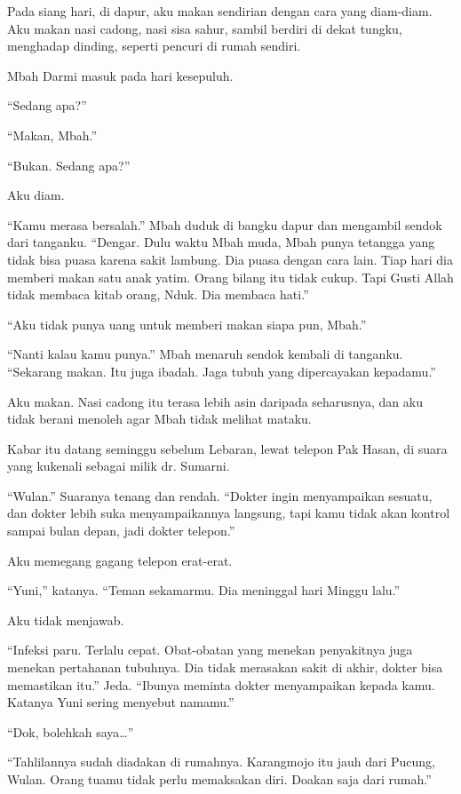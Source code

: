 \documentclass[11pt,twoside,openany]{book}
\makeatletter
\newcommand{\scenebreak}{\par\vspace{0.9em}{\centering\textsc{*\hspace{0.7em}*\hspace{0.7em}*}\par}\vspace{0.9em}\@afterindentfalse\@afterheading}
\makeatother
\begin{document}
Pada siang hari, di dapur, aku makan sendirian dengan cara yang diam-diam. Aku makan nasi cadong, nasi sisa sahur, sambil berdiri di dekat tungku, menghadap dinding, seperti pencuri di rumah sendiri.

Mbah Darmi masuk pada hari kesepuluh.

``Sedang apa?''

``Makan, Mbah.''

``Bukan. Sedang apa?''

Aku diam.

``Kamu merasa bersalah.'' Mbah duduk di bangku dapur dan mengambil sendok dari tanganku. ``Dengar. Dulu waktu Mbah muda, Mbah punya tetangga yang tidak bisa puasa karena sakit lambung. Dia puasa dengan cara lain. Tiap hari dia memberi makan satu anak yatim. Orang bilang itu tidak cukup. Tapi Gusti Allah tidak membaca kitab orang, Nduk. Dia membaca hati.''

``Aku tidak punya uang untuk memberi makan siapa pun, Mbah.''

``Nanti kalau kamu punya.'' Mbah menaruh sendok kembali di tanganku. ``Sekarang makan. Itu juga ibadah. Jaga tubuh yang dipercayakan kepadamu.''

Aku makan. Nasi cadong itu terasa lebih asin daripada seharusnya, dan aku tidak berani menoleh agar Mbah tidak melihat mataku.

\scenebreak
Kabar itu datang seminggu sebelum Lebaran, lewat telepon Pak Hasan, di suara yang kukenali sebagai milik dr. Sumarni.

``Wulan.'' Suaranya tenang dan rendah. ``Dokter ingin menyampaikan sesuatu, dan dokter lebih suka menyampaikannya langsung, tapi kamu tidak akan kontrol sampai bulan depan, jadi dokter telepon.''

Aku memegang gagang telepon erat-erat.

``Yuni,'' katanya. ``Teman sekamarmu. Dia meninggal hari Minggu lalu.''

Aku tidak menjawab.

``Infeksi paru. Terlalu cepat. Obat-obatan yang menekan penyakitnya juga menekan pertahanan tubuhnya. Dia tidak merasakan sakit di akhir, dokter bisa memastikan itu.'' Jeda. ``Ibunya meminta dokter menyampaikan kepada kamu. Katanya Yuni sering menyebut namamu.''

``Dok, bolehkah saya\ldots{}''

``Tahlilannya sudah diadakan di rumahnya. Karangmojo itu jauh dari Pucung, Wulan. Orang tuamu tidak perlu memaksakan diri. Doakan saja dari rumah.''
\end{document}
